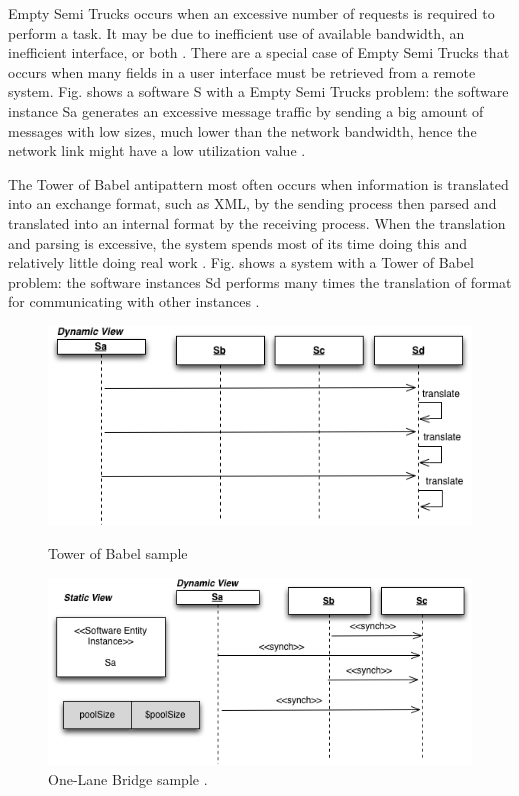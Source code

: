 \documentclass{report}
\begin{document}
Empty Semi Trucks occurs when an excessive number of requests is required to perform a task. It may be due to inefficient use of available bandwidth, an inefficient interface, or both \cite{Arcelli2012}. There are a special case of Empty Semi Trucks that occurs  when many fields in a user interface must be retrieved from a
remote system. Fig. shows a software S with a Empty Semi Trucks problem: the software instance Sa generates an excessive message traffic by sending a big amount of messages with low sizes, much lower than the network bandwidth, hence the network link might have a low utilization value \cite{Vetoio2011}.

The Tower of Babel antipattern most often occurs when information is translated into an exchange format, such as XML, by the sending process then parsed and translated into an
internal format by the receiving process. When the translation and parsing is excessive, the system spends most
of its time doing this and relatively little doing real work \cite{Smith2003}. Fig. shows a system with a Tower of Babel problem: the software instances Sd performs many times the translation of format for communicating with other instances \cite{Vetoio2011}.

\begin{figure}[H]
\begin{minipage}{.5\textwidth}
\centering
\includegraphics[width=1\textwidth]{./images/babel2.png}
\caption{Tower of Babel sample \cite{Vetoio2011}}
\label{fig:babel}
\end{minipage}
\begin{minipage}{.5\textwidth}
\centering
\includegraphics[width=1\textwidth]{./images/onelane.png}
\caption{One-Lane Bridge sample \cite{Vetoio2011}.}
\label{fig:onelane}
\end{minipage}
\end{figure}
\end{document}
